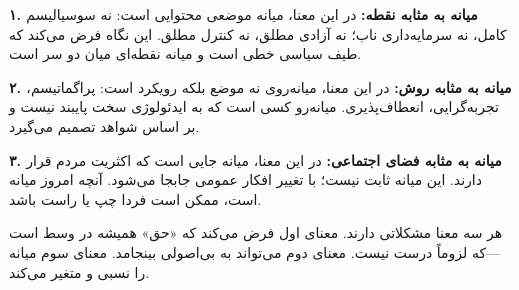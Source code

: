 \begin{center}
\end{center}


\textbf{۱. میانه به مثابه نقطه:}
در این معنا، میانه موضعی محتوایی است: نه سوسیالیسم کامل، نه سرمایه‌داری ناب؛ نه آزادی مطلق، نه کنترل مطلق. این نگاه فرض می‌کند که طیف سیاسی خطی است و میانه نقطه‌ای میان دو سر است.

\textbf{۲. میانه به مثابه روش:}
در این معنا، میانه‌روی نه موضع بلکه رویکرد است: پراگماتیسم، تجربه‌گرایی، انعطاف‌پذیری. میانه‌رو کسی است که به ایدئولوژی سخت پایبند نیست و بر اساس شواهد تصمیم می‌گیرد.

\textbf{۳. میانه به مثابه فضای اجتماعی:}
در این معنا، میانه جایی است که اکثریت مردم قرار دارند. این میانه ثابت نیست؛ با تغییر افکار عمومی جابجا می‌شود. آنچه امروز میانه است، ممکن است فردا چپ یا راست باشد.

هر سه معنا مشکلاتی دارند. معنای اول فرض می‌کند که «حق» همیشه در وسط است—که لزوماً درست نیست. معنای دوم می‌تواند به بی‌اصولی بینجامد. معنای سوم میانه را نسبی و متغیر می‌کند.


